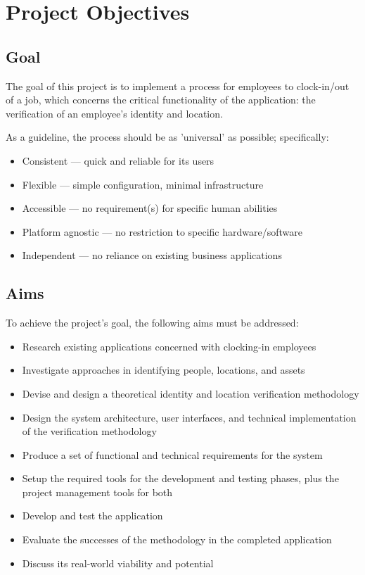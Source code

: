 \section{Project Objectives}

\subsection{Goal} \label{ss:goal}
The goal of this project is to implement a process for
employees to clock-in/out of a job, which concerns the
critical functionality of the application: the verification
of an employee's identity and location.

As a guideline, the process should be as 'universal' as
possible; specifically:

\begin{itemize}
  \item Consistent --- quick and reliable for its users
  \item Flexible --- simple configuration, minimal
        infrastructure
  \item Accessible --- no requirement(s) for specific
        human abilities
  \item Platform agnostic --- no restriction to specific
        hardware/software
  \item Independent --- no reliance on existing business
        applications
\end{itemize}

\subsection{Aims}
To achieve the project's goal, the following aims must be
addressed:

\begin{itemize}
  \item Research existing applications concerned with
        clocking-in employees
  \item Investigate approaches in identifying people,
        locations, and assets
  \item Devise and design a theoretical identity and
        location verification methodology
  \item Design the system architecture, user interfaces,
        and technical implementation of the
        verification methodology
  \item Produce a set of functional and technical
        requirements for the system
  \item Setup the required tools for the development and
        testing phases, plus the project management tools
        for both
  \item Develop and test the application
  \item Evaluate the successes of the methodology in the
        completed application
  \item Discuss its real-world viability and potential
\end{itemize}
